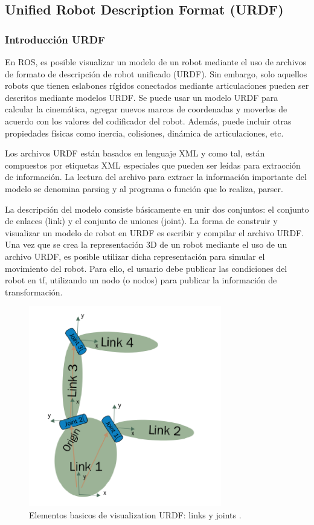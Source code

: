                         \newpage

    \subsection{Unified Robot Description Format (URDF)}\label{cap2_urfdf}
    
        \subsubsection{Introducción URDF}
    
        En ROS, es posible visualizar un modelo de un robot mediante el uso de archivos de formato de descripción de robot unificado (URDF). Sin embargo, solo aquellos robots que tienen eslabones rígidos conectados mediante articulaciones pueden ser descritos mediante modelos URDF.  Se puede usar un modelo URDF para calcular la cinemática, agregar nuevos marcos de coordenadas y moverlos de acuerdo con los valores del codificador del robot. Además, puede incluir otras propiedades físicas como inercia, colisiones, dinámica de articulaciones, etc. 
        
        Los archivos URDF están basados en lenguaje XML y como tal, están compuestos por etiquetas XML especiales que pueden ser leídas para extracción de información. La lectura del archivo para extraer la información importante del modelo se denomina parsing y al programa o función que lo realiza, parser.
        
        La descripción del modelo consiste básicamente en  unir dos conjuntos: el conjunto de enlaces (link) y el conjunto de uniones (joint). La forma de construir y visualizar un modelo de robot en URDF es escribir y compilar el archivo URDF. Una vez que se crea la representación 3D de un robot mediante el uso de un archivo URDF, es posible utilizar dicha representación para simular el movimiento del robot. Para ello, el usuario debe publicar las condiciones del robot en tf, utilizando un nodo (o nodos) para publicar la información de transformación.
        
        \begin{figure}[htb]
            \centering
            \includegraphics[width=0.55\linewidth]{Main/Chapter3/Images3/3-7/representacion-de-eslabon-en-urdf.png}
            \caption{Elementos basicos de visualization URDF: links y joints \cite{urdftutorials}.}
            \label{f:Cap3-7_eslabon_urdf}
        \end{figure} 
        
